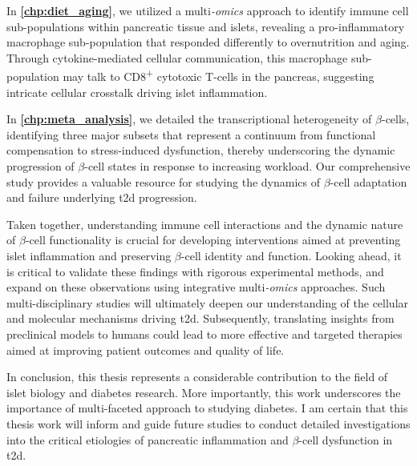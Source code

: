 \par  In \textbf{\autoref{chp:diet_aging}}, we utilized a multi\textit{-omics} approach to identify immune cell sub-populations within pancreatic tissue and islets, revealing a pro-inflammatory macrophage sub-population that responded differently to overnutrition and aging. Through cytokine-mediated cellular communication, this macrophage sub-population may talk to CD8\textsuperscript{+} cytotoxic T-cells in the pancreas, suggesting intricate cellular crosstalk driving islet inflammation.\\

\par In \textbf{\autoref{chp:meta_analysis}}, we detailed the transcriptional heterogeneity of $\beta$-cells, identifying three major subsets that represent a continuum from functional compensation to stress-induced dysfunction, thereby underscoring the dynamic progression of $\beta$-cell states in response to increasing workload. Our comprehensive study provides a valuable resource for studying the dynamics of $\beta$-cell adaptation and failure underlying \gls{t2d} progression.\\

\par Taken together, understanding immune cell interactions and the dynamic nature of $\beta$-cell functionality is crucial for developing interventions aimed at preventing islet inflammation and preserving $\beta$-cell identity and function. Looking ahead, it is critical to validate these findings with rigorous experimental methods, and expand on these observations using integrative multi\textit{-omics} approaches. Such multi-disciplinary studies will ultimately deepen our understanding of the cellular and molecular mechanisms driving \gls{t2d}. Subsequently, translating insights from preclinical models to humans could lead to more effective and targeted therapies aimed at improving patient outcomes and quality of life.\\


\par In conclusion, this thesis represents a considerable contribution to the field of islet biology and diabetes research. More importantly, this work underscores the importance of multi-faceted approach to studying diabetes. I am certain that this thesis work will inform and guide future studies to conduct detailed investigations into the critical etiologies of pancreatic inflammation and $\beta$-cell dysfunction in \gls{t2d}.\\